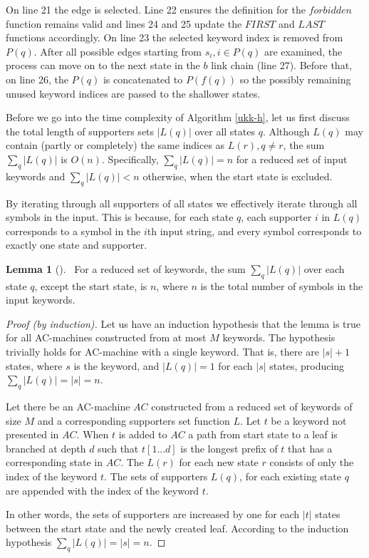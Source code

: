 \documentclass[english,twoside,censored,csm,algorithms-track-2020]{HYthesisML}
\theoremstyle{plain}
\theoremstyle{definition}
\newtheorem{lemma}[theorem]{Lemma}
\begin{document}
On line 21 the edge is selected. Line 22 ensures the definition for the $forbidden$ function
remains valid and lines 24 and 25 update the $FIRST$ and $LAST$ functions accordingly.
On line 23 the selected keyword index is removed from $P(q)$.
After all possible edges starting from
$s_i, i\in {P(q)}$ are examined, the process can move on to the next state in the $b$ link chain (line 27).
Before that, on line 26, the $P(q)$ is concatenated to $P(f(q))$ so the possibly remaining unused
keyword indices are passed to the shallower states.

Before we go into the time complexity of Algorithm \ref{ukk-h}, let us first discuss the
total length of supporters sets $|L(q)|$ over all states $q$. Although $L(q)$ may contain
(partly or completely)
the same indices as $L(r), q\neq r$, the sum $\sum_q |L(q)|$ is $O(n)$. Specifically,
$\sum_q |L(q)| = n$ for a reduced set of input keywords and $\sum_q |L(q)| < n$ otherwise,
when the start state is excluded.

By iterating
through all supporters of all states we effectively iterate through all symbols
in the input. This is because, for each state $q$, each supporter $i$ in $L(q)$ corresponds to a
symbol in the $i$th input string, and every symbol corresponds to exactly one state and supporter.

\begin{lemma}[]~\label{lem-supporters}
  For a reduced set of keywords, the sum $\sum_q |L(q)|$ over each state $q$, except the start state,
  is $n$, where $n$ is the
  total number of symbols in the input keywords.
\end{lemma}
\begin{proof}[Proof (by induction)]
  Let us have an induction hypothesis that the lemma is true for all AC-machines constructed from 
  at most $M$ keywords. The hypothesis trivially holds for AC-machine with a single keyword. That is,
  there are $|s|+1$ states, where $s$ is the keyword, and $|L(q)| = 1$ for each $|s|$ states,
  producing $\sum_q |L(q)| = |s| = n$.

  Let there be an AC-machine $AC$ constructed from a reduced set of keywords of size $M$ and a
  corresponding supporters set function $L$. Let $t$ be a keyword not presented in $AC$.
  When $t$ is added to $AC$ a path from start state to a leaf is branched at depth $d$ such that
  $t[1...d]$ is the longest prefix of $t$ that has a corresponding state in $AC$. The $L(r)$ for
  each new state $r$ consists of only the index of the keyword $t$. The sets of supporters $L(q)$,
  for each existing state $q$ are appended with the index of the keyword $t$.

  In other words, the sets of supporters are increased by one for each $|t|$ states between
  the start state and the newly created leaf. According to the induction hypothesis
  $\sum_q |L(q)| = |s| = n$.

\end{proof}
\end{document}

